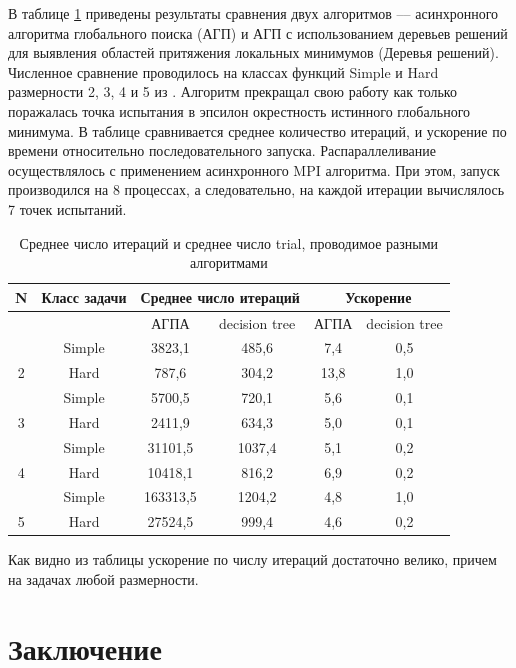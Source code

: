 \documentclass{svproc}
\begin{document}
В таблице \ref{tab:2} приведены результаты сравнения двух алгоритмов –-- асинхронного алгоритма глобального поиска (АГП) и АГП с использованием деревьев решений для выявления областей притяжения локальных минимумов (Деревья решений). Численное сравнение проводилось на классах функций Simple и Hard размерности 2, 3, 4 и 5 из \cite{fio_bib19}. Алгоритм прекращал свою работу как только поражалась точка испытания в эпсилон окрестность истинного глобального минимума. В таблице сравнивается среднее количество итераций, и ускорение по времени относительно последовательного запуска. Распараллеливание  осуществлялось с применением асинхронного MPI алгоритма. При этом, запуск производился на 8 процессах, а следовательно, на каждой итерации вычислялось 7 точек испытаний.


\begin{table}[h!]
	\caption{Среднее число итераций и среднее число trial, проводимое разными алгоритмами}
	\label{tab:2}
	\centering
	\begin{tabular}{|c|c|c|c|c|c|}
		\hline
		
		N & Класс задачи & \multicolumn{2}{c|}{Среднее число итераций} & \multicolumn{2}{c|}{Ускорение} \\ \hline
		& ~ & АГПА & decision tree & АГПА & decision tree \\ \hline
		& Simple & 3823,1   & 485,6  & 7,4   & 0,5 \\ \hline
		2  & Hard & 787,6    & 304,2  & 13,8  & 1,0 \\ \hline
		& Simple & 5700,5   & 720,1  & 5,6   & 0,1 \\ \hline
		3  & Hard & 2411,9   & 634,3  & 5,0   & 0,1 \\ \hline
		& Simple & 31101,5  & 1037,4 & 5,1   & 0,2 \\ \hline
		4  & Hard & 10418,1  & 816,2  & 6,9   & 0,2 \\ \hline
		& Simple & 163313,5 & 1204,2 & 4,8   & 1,0 \\ \hline
		5  & Hard & 27524,5  & 999,4  & 4,6   & 0,2 \\ \hline
	\end{tabular}
\end{table}

Как видно из таблицы ускорение по числу итераций достаточно велико, причем на задачах любой размерности. 

\section{Заключение}\label{SecC}
\end{document}
